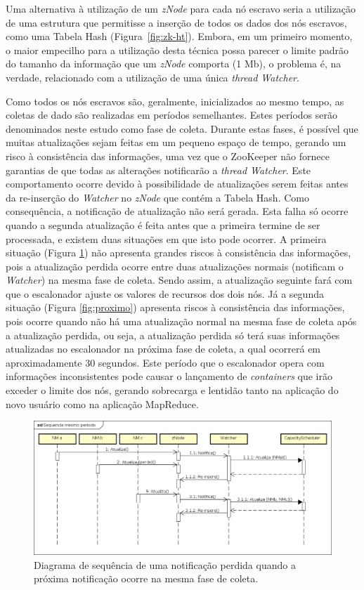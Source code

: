 Uma alternativa à utilização de um \textit{zNode} para cada nó escravo seria a utilização de uma estrutura que permitisse a inserção de todos os dados dos nós escravos, como uma Tabela Hash (Figura~\ref{fig:zk-ht}). Embora, em um primeiro momento, o maior empecilho para a utilização desta técnica possa parecer o limite padrão do tamanho da informação que um \textit{zNode} comporta (1 Mb), o problema é, na verdade, relacionado com a utilização de uma única \textit{thread Watcher}. 

Como todos os nós escravos são, geralmente, inicializados ao mesmo tempo, as coletas de dado são realizadas em períodos semelhantes. Estes períodos serão denominados neste estudo como fase de coleta. Durante estas fases, é possível que muitas atualizações sejam feitas em um pequeno espaço de tempo, gerando um risco à consistência das informações, uma vez que o ZooKeeper não fornece garantias de que todas as alterações notificarão a \textit{thread Watcher}. Este comportamento ocorre devido à possibilidade de atualizações serem feitas antes da re-inserção do \textit{Watcher} no \textit{zNode} que contém a Tabela Hash. Como consequência, a notificação de atualização não será gerada. Esta falha só ocorre quando a segunda atualização é feita antes que a primeira termine de ser processada, e existem duas situações em que isto pode ocorrer. A primeira situação (Figura \ref{fig:mesmo}) não apresenta grandes riscos à consistência das informações, pois a atualização perdida  ocorre entre duas atualizações normais (notificam o \textit{Watcher}) na mesma fase de coleta. Sendo assim, a atualização seguinte fará com que o escalonador ajuste os valores de recursos dos dois nós. Já a segunda situação (Figura \ref{fig:proximo}) apresenta riscos à consistência das informações, pois ocorre quando não há uma atualização normal na mesma fase de coleta após a atualização perdida, ou seja, a atualização perdida só terá suas informações atualizadas no escalonador na próxima fase de coleta, a qual ocorrerá em aproximadamente 30 segundos. Este período que o escalonador opera com informações inconsistentes pode causar o lançamento de \textit{containers} que irão exceder o limite dos nós, gerando sobrecarga e lentidão tanto na aplicação do novo usuário como na aplicação MapReduce.


\begin{figure}[!hbt]
   \centering
   \includegraphics[width=\textwidth]{figuras/seq-sam-per.png}
   \caption{Diagrama de sequência de uma notificação perdida quando a próxima notificação ocorre na mesma fase de coleta.}
   \label{fig:mesmo}
\end{figure}


